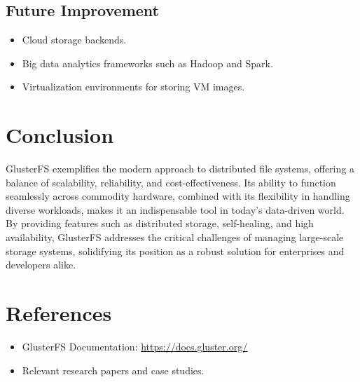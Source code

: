 \documentclass[a4paper,12pt]{article}
\begin{document}
\subsection{Future Improvement}
\begin{itemize}
    \item Cloud storage backends.
    \item Big data analytics frameworks such as Hadoop and Spark.
    \item Virtualization environments for storing VM images.
\end{itemize}

\section{Conclusion}
GlusterFS exemplifies the modern approach to distributed file systems, offering a balance of scalability, reliability, and cost-effectiveness. Its ability to function seamlessly across commodity hardware, combined with its flexibility in handling diverse workloads, makes it an indispensable tool in today’s data-driven world. By providing features such as distributed storage, self-healing, and high availability, GlusterFS addresses the critical challenges of managing large-scale storage systems, solidifying its position as a robust solution for enterprises and developers alike.

\section*{References}
\begin{itemize}
    \item GlusterFS Documentation: \url{https://docs.gluster.org/}
    \item Relevant research papers and case studies.
\end{itemize}
\end{document}
